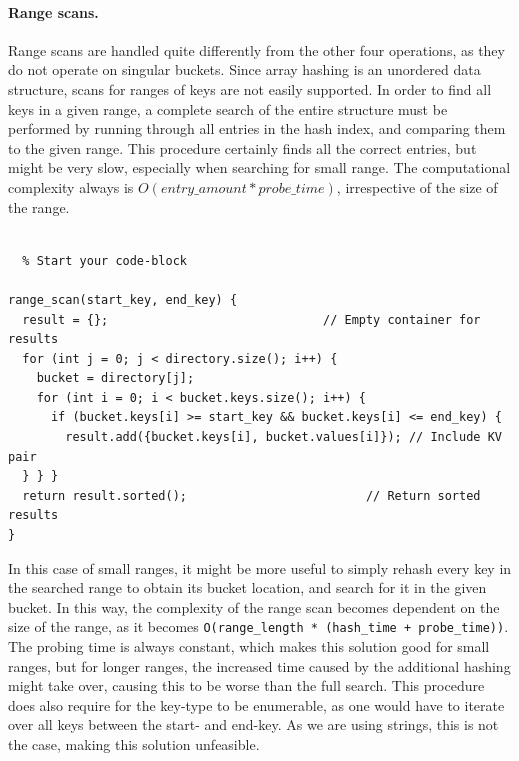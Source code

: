 \documentclass[11pt]{article} %
\begin{document}
\paragraph{Range scans.} Range scans are handled quite differently from the other four operations, as they do not operate on singular buckets. Since array hashing is an unordered data structure, scans for ranges of keys are not easily supported. In order to find all keys in a given range, a complete search of the entire structure must be performed by running through all entries in the hash index, and comparing them to the given range. This procedure certainly finds all the correct entries, but might be very slow, especially when searching for small range. The computational complexity always is $O(entry\_amount * probe\_time)$, irrespective of the size of the range. \\
\\
\begin{fminipage}{\linewidth}
\begin{lstlisting}  % Start your code-block

range_scan(start_key, end_key) {
  result = {};                              // Empty container for results
  for (int j = 0; j < directory.size(); i++) {
    bucket = directory[j];
    for (int i = 0; i < bucket.keys.size(); i++) {
      if (bucket.keys[i] >= start_key && bucket.keys[i] <= end_key) {
        result.add({bucket.keys[i], bucket.values[i]}); // Include KV pair
  } } }
  return result.sorted();                         // Return sorted results
}

\end{lstlisting}
\end{fminipage}

In this case of small ranges, it might be more useful to simply rehash every key in the searched range to obtain its bucket location, and search for it in the given bucket. In this way, the complexity of the range scan becomes dependent on the size of the range, as it becomes \verb|O(range_length * (hash_time + probe_time))|. The probing time is always constant, which makes this solution good for small ranges, but for longer ranges, the increased time caused by the additional hashing might take over, causing this to be worse than the full search. This procedure does also require for the key-type to be enumerable, as one would have to iterate over all keys between the start- and end-key. As we are using strings, this is not the case, making this solution unfeasible.
\end{document}
